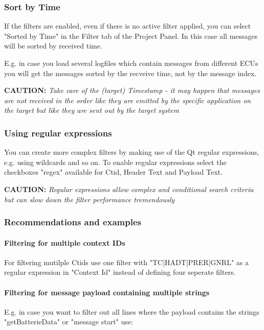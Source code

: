 \documentclass[a4paper,11pt]{article}
\newcommand{\caution}[1]{\begin{ibox} \textbf{CAUTION:} \emph{#1} \end{ibox}}
\begin{document}
\subsubsection{Sort by Time}
\label{sortbytime}
If the filters are enabled, even if there is no active filter applied, you can select "Sorted by Time" in the
Filter tab of the Project Panel. In this case all messages will be sorted by received time.

E.g. in case you load several logfiles which contain messages from different ECUs you will get the messages sorted by the recveive time, not by the message index.

\caution{Take care of the (target) Timestamp - it may happen that messages are not received in the order
like they are emitted by the specific application on the target but like they are sent out by the target system}


\subsubsection{Using regular expressions}
You can create more complex filters by making use of the Qt regular expressions, e.g. using wildcards and so on.
To enable regular expressions select the checkboxes "regex" available for Ctid, Header Text and Payload Text.

\caution{Regular expressions allow complex and conditional search criteria but can slow down the filter performance tremendously}

\subsubsection{Recommendations and examples}

\paragraph{Filtering for multiple context IDs}
For filtering mutilple Ctids use one filter with "TC|HADT|PRER|GNRL" as a regular expression in "Context Id" instead of defining four seperate filters.

\paragraph{Filtering for message payload containing multiple strings}

E.g. in case you want to filter out all lines where the payload contains the strings "getBatterieData" or "message start" use:
\end{document}
